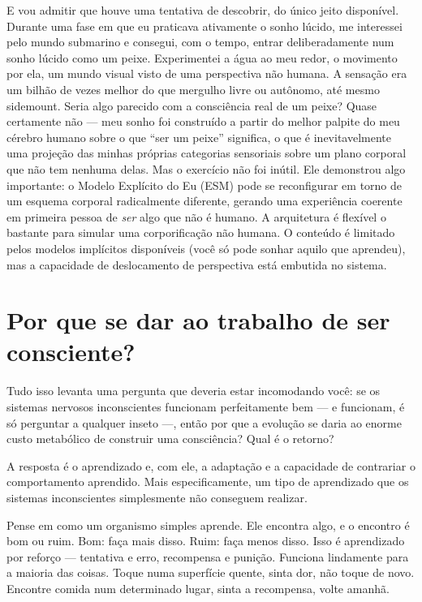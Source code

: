 \documentclass[11pt, twoside, openright]{book}
\begin{document}
E vou admitir que houve uma tentativa de descobrir, do único jeito disponível. Durante uma fase em que eu praticava ativamente o sonho lúcido, me interessei pelo mundo submarino e consegui, com o tempo, entrar deliberadamente num sonho lúcido como um peixe. Experimentei a água ao meu redor, o movimento por ela, um mundo visual visto de uma perspectiva não humana. A sensação era um bilhão de vezes melhor do que mergulho livre ou autônomo, até mesmo sidemount. Seria algo parecido com a consciência real de um peixe? Quase certamente não --- meu sonho foi construído a partir do melhor palpite do meu cérebro humano sobre o que ``ser um peixe'' significa, o que é inevitavelmente uma projeção das minhas próprias categorias sensoriais sobre um plano corporal que não tem nenhuma delas. Mas o exercício não foi inútil. Ele demonstrou algo importante: o Modelo Explícito do Eu (ESM) pode se reconfigurar em torno de um esquema corporal radicalmente diferente, gerando uma experiência coerente em primeira pessoa de \textit{ser} algo que não é humano. A arquitetura é flexível o bastante para simular uma corporificação não humana. O conteúdo é limitado pelos modelos implícitos disponíveis (você só pode sonhar aquilo que aprendeu), mas a capacidade de deslocamento de perspectiva está embutida no sistema.

\section*{Por que se dar ao trabalho de ser consciente?}

Tudo isso levanta uma pergunta que deveria estar incomodando você: se os sistemas nervosos inconscientes funcionam perfeitamente bem --- e funcionam, é só perguntar a qualquer inseto ---, então por que a evolução se daria ao enorme custo metabólico de construir uma consciência? Qual é o retorno?

A resposta é o aprendizado e, com ele, a adaptação e a capacidade de contrariar o comportamento aprendido. Mais especificamente, um tipo de aprendizado que os sistemas inconscientes simplesmente não conseguem realizar.

Pense em como um organismo simples aprende. Ele encontra algo, e o encontro é bom ou ruim. Bom: faça mais disso. Ruim: faça menos disso. Isso é aprendizado por reforço --- tentativa e erro, recompensa e punição. Funciona lindamente para a maioria das coisas. Toque numa superfície quente, sinta dor, não toque de novo. Encontre comida num determinado lugar, sinta a recompensa, volte amanhã.
\end{document}

